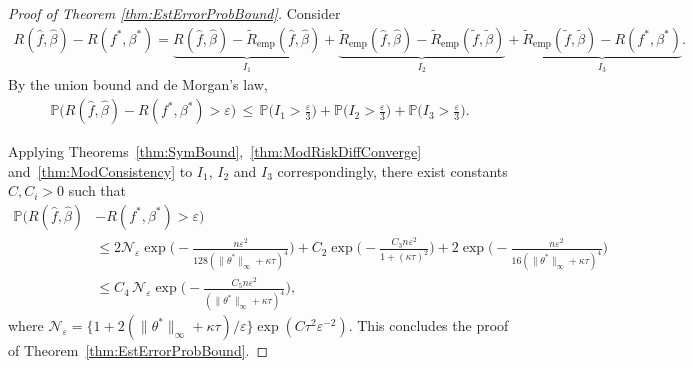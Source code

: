 \documentclass[twoside, onecolumn]{article}
\def\varep{\varepsilon}
\begin{document}
\begin{proof}[Proof of Theorem \ref{thm:EstErrorProbBound}]
Consider
\begin{align*}
R(\widehat{f},\widehat{\beta})- R(f^\ast,\beta^\ast)=\underbrace{R(\widehat{f}, \widehat{\beta})-\widetilde{R}_{\text{emp}}(\widehat{f}, \widehat{\beta})}_{I_1}+\underbrace{\widetilde{R}_{\text{emp}}(\widehat{f}, \widehat{\beta})-\widetilde{R}_{\text{emp}}(\widetilde{f}, \widetilde{\beta})}_{I_2}
+\underbrace{\widetilde{R}_{\text{emp}}(\widetilde{f}, \widetilde{\beta})- R(f^\ast,\beta^\ast)}_{I_3}.
\end{align*}
By the union bound and de Morgan's law,
\begin{align*}
\mathbb{P}\Big(R(\widehat f, \widehat \beta)-R(f^*,\beta^*)>\varepsilon\Big)\,\leq \,\mathbb{P}\Big( I_1 >\frac{\varepsilon}{3}\Big)+\mathbb{P}\Big( I_2 >\frac{\varepsilon}{3}\Big)+
\mathbb{P}\Big( I_3 >\frac{\varepsilon}{3}\Big).
\end{align*}

Applying Theorems~\ref{thm:SymBound},~\ref{thm:ModRiskDiffConverge} and~\ref{thm:ModConsistency} to $I_1$, $I_2$ and $I_3$ correspondingly, there exist constants $C,C_i >0$ such that
\begin{align*}
\mathbb{P}\Big(R(\widehat{f},\widehat{\beta})&- R(f^\ast,\beta^\ast)>\varep\Big)\\
&\leq 2\mathcal{N}_{\varep}\exp\Big(-  \frac{n\varepsilon^2}{128(\|\theta^*\|_\infty+\kappa \tau)^{4}}\Big)+C_2\exp\Big( -\frac{C_3n \varepsilon^2}{1+(\kappa\tau)^2}\Big)+2\exp\Big(-\frac{n \varepsilon^2}{16(\|\theta^*\|_\infty+\kappa \tau)^4}\Big)\\
&\leq C_4\, \mathcal{N_\varepsilon}\exp\Big(-\frac{C_5 n \varepsilon^2}{(\|\theta^*\|_\infty+\kappa \tau)^4}\Big), 
\end{align*}
where $\mathcal{N}_{\varep}=\{1+2(\|\theta^*\|_\infty+\kappa\tau)/\varep\} \exp( C\tau^2 \varepsilon^{-2})$. This concludes the proof of Theorem~\ref{thm:EstErrorProbBound}.

\end{proof}
\end{document}
